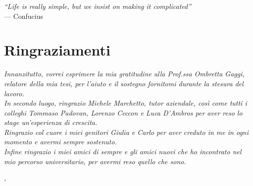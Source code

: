 
\cleardoublepage
{}
{}

\begin{flushright}{
	\slshape    
	``Life is really simple, but we insist on making it complicated''} \\ 
	\medskip
    --- Confucius
\end{flushright}


\bigskip

\begingroup
\let\clearpage\relax
\let\cleardoublepage\relax
\let\cleardoublepage\relax

\chapter*{Ringraziamenti}

\noindent \textit{Innanzitutto, vorrei esprimere la mia gratitudine alla Prof.ssa Ombretta Gaggi, relatore della mia tesi, per l'aiuto e il sostegno fornitomi durante la stesura del lavoro.}\\

\noindent \textit{In secondo luogo, ringrazio Michele Marchetto, tutor aziendale, così come tutti i colleghi Tommaso Padovan, Lorenzo Ceccon e Luca D'Ambros per aver reso lo stage un'esperienza di crescita.}\\

\noindent \textit{Ringrazio col cuore i miei genitori Giulia e Carlo per aver creduto in me in ogni momento e avermi sempre sostenuto.}\\

\noindent \textit{Infine ringrazio i miei amici di sempre e gli amici nuovi che ho incontrato nel mio percorso universitario, per avermi reso quello che sono.}\\
\bigskip

\noindent\textit{\myLocation, \myTime}
\hfill \myName

\endgroup

